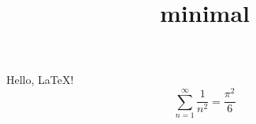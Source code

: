 \renewcommand\normalsize{\fontsize{10pt}{12pt}\selectfont}
\title{minimal}
\setlength\hoffset{-1in}
\setlength\voffset{-1in}
\setlength\oddsidemargin{0pt}
\setlength\topmargin{0pt}
\setlength\headheight{0pt}
\setlength\headsep{0pt}
\setlength\textheight{20mm}
\setlength\pageheight{\textheight}
\setlength\textwidth{40mm}
\setlength\pagewidth{\textwidth}
\setlength\parindent{0mm}


Hello, \LaTeX!
$$\sum_{n = 1}^\infty\frac1{n^2} = \frac{\pi^2}{6}$$


